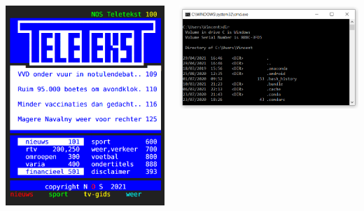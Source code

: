 \documentclass[../presentatie.tex]{subfiles}
\begin{document}
    \begin{frame}
        \begin{columns}
            \begin{column}{0.5\textwidth}\centering
                \includegraphics[width=\linewidth,height=0.9\textheight,keepaspectratio]{assets/teletekst.png}
            \end{column}
            \begin{column}{0.5\textwidth}\centering
                \includegraphics[width=\linewidth]{assets/commandPrompt.png}
                

\end{column}
\end{columns}
\end{frame}
\end{document}
